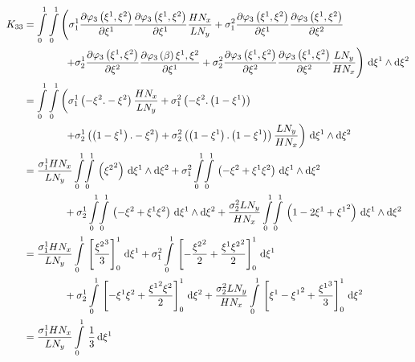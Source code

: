\begin{equation}
  \begin{aligned}
    K_{33}&=\dintl{0}{1}\dintl{0}{1}\left(
    \conductivitytensorsymbol^{1}_{1}\delby{\lbfn{3}{\xione,\xitwo}}{\xione}
    \delby{\lbfn{3}{\xione,\xitwo}}{\xione}\dfrac{H N_{x}}{L N_{y}}+
    \conductivitytensorsymbol^{2}_{1}\delby{\lbfn{3}{\xione,\xitwo}}{\xione}
    \delby{\lbfn{3}{\xione,\xitwo}}{\xitwo}\right.\\
    &\qquad\qquad\left.+\conductivitytensorsymbol^{1}_{2}\delby{\lbfn{3}{\xione,\xitwo}}{\xitwo}
    \delby{\lbfn{3}{\beta}{\xione,\xitwo}}{\xione}+
    \conductivitytensorsymbol^{2}_{2}\delby{\lbfn{3}{\xione,\xitwo}}{\xitwo}
    \delby{\lbfn{3}{\xione,\xitwo}}{\xitwo}\dfrac{L N_{y}}{H N_{x}}\right)\infinitesimaltwo{\xione}{\xitwo}\\
    &=\dintl{0}{1}\dintl{0}{1}\left(
    \conductivitytensorsymbol^{1}_{1}\pbrac{-\xitwo.-\xitwo}\dfrac{H N_{x}}{L N_{y}}+
    \conductivitytensorsymbol^{2}_{1}\pbrac{-\xitwo.\pbrac{1-\xione}}\right.\\
    &\qquad\qquad\left.+\conductivitytensorsymbol^{1}_{2}\pbrac{\pbrac{1-\xione}.-\xitwo}+
    \conductivitytensorsymbol^{2}_{2}\pbrac{\pbrac{1-\xione}.\pbrac{1-\xione}}\dfrac{L N_{y}}{H N_{x}}\right)
    \infinitesimaltwo{\xione}{\xitwo}\\
    &=\dfrac{\conductivitytensorsymbol^{1}_{1} H N_{x}}{L N_{y}}\giint{0}{1}{0}{1}{\pbrac{\xitwosq}}{\xione}{\xitwo}
    +\conductivitytensorsymbol^{2}_{1}\giint{0}{1}{0}{1}{\pbrac{-\xitwo+\xione\xitwo}}{\xione}{\xitwo}\\
    &\qquad\qquad+\conductivitytensorsymbol^{1}_{2}\giint{0}{1}{0}{1}{\pbrac{-\xitwo+\xione\xitwo}}{\xione}{\xitwo}
    +\dfrac{\conductivitytensorsymbol^{2}_{2} L N_{y}}{H N_{x}}\giint{0}{1}{0}{1}{\pbrac{1-2\xione+\xionesq}}{\xione}{\xitwo} \\
    &=\dfrac{\conductivitytensorsymbol^{1}_{1} H N_{x}}{L N_{y}}\gint{0}{1}{\sqbrac{\dfrac{\xitwocube}{3}}^{1}_{0}}{\xione}
    +\conductivitytensorsymbol^{2}_{1}\gint{0}{1}{\sqbrac{-\dfrac{\xitwosq}{2}+\dfrac{\xione\xitwosq}{2}}^{1}_{0}}{\xione}\\
    &\qquad\qquad+\conductivitytensorsymbol^{1}_{2}\gint{0}{1}{\sqbrac{-\xione\xitwo+\dfrac{\xionesq\xitwo}{2}}^{1}_{0}}{\xitwo}
    +\dfrac{\conductivitytensorsymbol^{2}_{2} L N_{y}}{H N_{x}}\gint{0}{1}{\sqbrac{\xione-\xionesq+\dfrac{\xionecube}{3}}^{1}_{0}}{\xitwo} \\
    &=\dfrac{\conductivitytensorsymbol^{1}_{1} H N_{x}}{L N_{y}}\gint{0}{1}{\dfrac{1}{3}}{\xione}

\end{aligned}
\end{equation}
